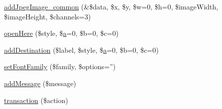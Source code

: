 \begin{DoxyCompactItemize}
\hyperlink{class_cpdf_aa5a35f03011edf15999be9ae1162d8d6}{add\-Jpeg\-Image\-\_\-common} (\&\$data, \$x, \$y, \$w=0, \$h=0, \$image\-Width, \$image\-Height, \$channels=3)
\item 
\hyperlink{class_cpdf_af01751de7cdbbc4b7a2eea6a20cd547b}{open\-Here} (\$style, \$\hyperlink{classa}{a}=0, \$b=0, \$c=0)
\item 
\hyperlink{class_cpdf_aaaf728b2907f43d773302554f8b8448e}{add\-Destination} (\$label, \$style, \$\hyperlink{classa}{a}=0, \$b=0, \$c=0)
\item 
\hyperlink{class_cpdf_a5ddaeab8f233dcdc13d1f3f13fa53367}{set\-Font\-Family} (\$family, \$options='')
\item 
\hyperlink{class_cpdf_a0fe60161c19f81f49f76a2dcb95d48e4}{add\-Message} (\$message)
\item 
\hyperlink{class_cpdf_a2b030911f9e13bcb79cf4ec5c7fda100}{transaction} (\$action)
\end{DoxyCompactItemize}
